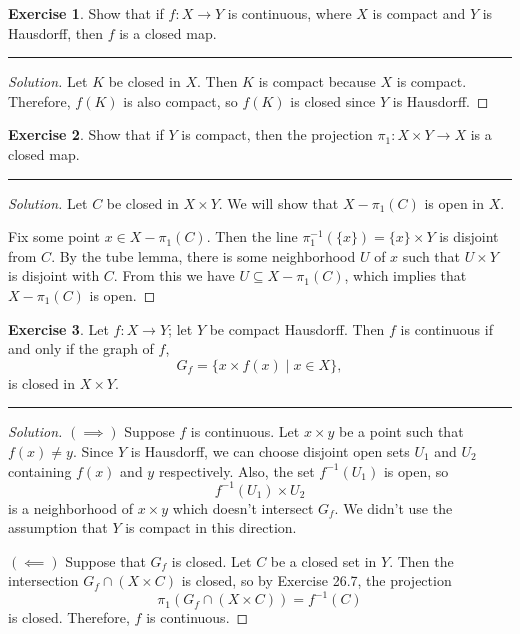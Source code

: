 \documentclass{article}
\theoremstyle{definition}
\newtheorem{exercise}{Exercise}[section]
\begin{document}
\pagebreak

\begin{exercise}
  Show that if $f:X\to Y$ is continuous, where $X$ is compact and $Y$ is Hausdorff, then $f$ is a closed map.
\end{exercise}
\hrule
\begin{proof}[Solution]
  Let $K$ be closed in $X$. Then $K$ is compact because $X$ is compact. Therefore, $f(K)$ is also compact, so $f(K)$ is closed since $Y$ is Hausdorff.
\end{proof}

\pagebreak

\begin{exercise}
  Show that if $Y$ is compact, then the projection $\pi_1:X\times Y\to X$ is a closed map.
\end{exercise}
\hrule
\begin{proof}[Solution]
  Let $C$ be closed in $X\times Y$. We will show that $X - \pi_1(C)$ is open in $X$.

  Fix some point $x\in X-\pi_1(C)$. Then the line $\pi_1^{-1}(\{x\}) = \{x\}\times Y$ is disjoint from $C$. By the tube lemma, there is some neighborhood $U$ of $x$ such that $U\times Y$ is disjoint with $C$. From this we have $U\subseteq X - \pi_1(C)$, which implies that $X - \pi_1(C)$ is open.
\end{proof}

\pagebreak

\begin{exercise}
  Let $f:X\to Y$; let $Y$ be compact Hausdorff. Then $f$ is continuous if and only if the graph of $f$,
  $$G_f = \{x\times f(x)\mid x\in X\},$$
  is closed in $X\times Y$.
\end{exercise}
\hrule
\begin{proof}[Solution]
  $(\implies)$ Suppose $f$ is continuous. Let $x\times y$ be a point such that $f(x)\ne y$. Since $Y$ is Hausdorff, we can choose disjoint open sets $U_1$ and $U_2$ containing $f(x)$ and $y$ respectively. Also, the set $f^{-1}(U_1)$ is open, so
  $$f^{-1}(U_1)\times U_2$$
  is a neighborhood of $x\times y$ which doesn't intersect $G_f$. We didn't use the assumption that $Y$ is compact in this direction.

  $(\impliedby)$ Suppose that $G_f$ is closed. Let $C$ be a closed set in $Y$. Then the intersection $G_f\cap (X\times C)$ is closed, so by Exercise 26.7, the projection
  $$\pi_1(G_f\cap(X\times C)) = f^{-1}(C)$$
  is closed. Therefore, $f$ is continuous.
\end{proof}
\end{document}
